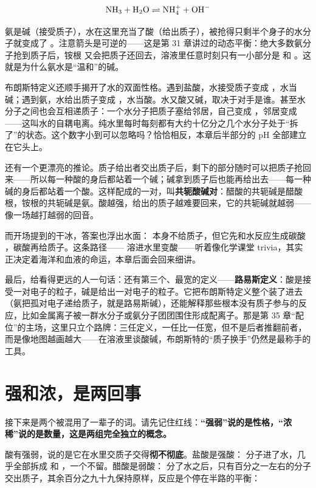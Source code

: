 \[\mathrm{NH_3} + \mathrm{H_2O} \rightleftharpoons \mathrm{NH_4^+} + \mathrm{OH^-}\]

氨是碱（接受质子），水在这里充当了酸（给出质子），被抢得只剩半个身子的水分子就变成了 。注意箭头是可逆的——这是第 31 章讲过的动态平衡：绝大多数氨分子抢到质子后，铵根  又会把质子还回去，溶液里任意时刻只有一小部分是  和 。这就是为什么氨水是“温和”的碱。

布朗斯特定义还顺手揭开了水的双面性格。遇到盐酸，水接受质子变成 ，水当碱；遇到氨，水给出质子变成 ，水当酸。水又酸又碱，取决于对手是谁。甚至水分子之间也会互相递质子：一个水分子把质子塞给邻居，自己变成 ，邻居变成 ——这叫水的自耦电离。纯水里每时每刻都有大约十亿分之几个水分子处于“拆了”的状态。这个数字小到可以忽略吗？恰恰相反，本章后半部分的 pH 全部建立在它头上。

还有一个更漂亮的推论。质子给出者交出质子后，剩下的部分随时可以把质子抢回来——所以每一种酸的身后都站着一个碱；碱拿到质子后也能再给出去——每一种碱的身后都站着一个酸。这样配成的一对，叫\textbf{共轭酸碱对}：醋酸的共轭碱是醋酸根，铵根的共轭碱是氨。酸越强，给出的质子越难要回来，它的共轭碱就越弱——像一场越打越弱的回音。

而开场提到的干冰，答案也浮出水面： 本身不给质子，但它先和水反应生成碳酸 ，碳酸再给质子。这条路径—— 溶进水里变酸——听着像化学课堂 trivia，其实正决定着海洋和血液的命运，本章后面会回来细讲。

最后，给看得更远的人一句话：还有第三个、最宽的定义——\textbf{路易斯定义}：酸是接受一对电子的粒子，碱是给出一对电子的粒子。它把布朗斯特定义整个装了进去（氨把孤对电子递给质子，就是路易斯碱），还能解释那些根本没有质子参与的反应，比如金属离子被一群水分子或氨分子团团围住形成配离子。那是第 35 章“配位”的主场，这里只立个路牌：三任定义，一任比一任宽，但不是后者推翻前者，而是像地图越画越大——在溶液里谈酸碱，布朗斯特的“质子换手”仍然是最称手的工具。

\section{强和浓，是两回事}

接下来是两个被混用了一辈子的词。请先记住红线：\textbf{“强弱”说的是性格，“浓稀”说的是数量，这是两组完全独立的概念。}

酸有强弱，说的是它在水里交质子交得\textbf{彻不彻底}。盐酸是强酸： 分子进了水，几乎全部拆成  和 ，一个不留。醋酸是弱酸： 分了水之后，只有百分之一左右的分子交出质子，其余百分之九十九保持原样，反应是个停在半路的平衡：

